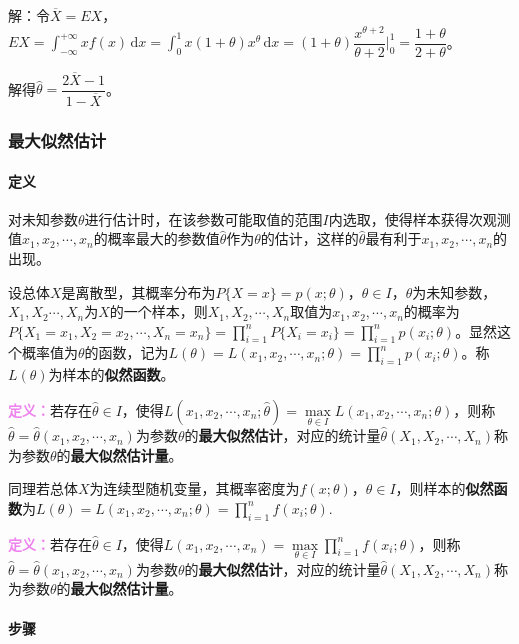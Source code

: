 \documentclass[UTF8, 12pt]{ctexart}
\begin{document}
解：令$\overline{X}=EX$，$EX=\int_{-\infty}^{+\infty}xf(x)\,\textrm{d}x=\int_0^1x(1+\theta)x^\theta\,\textrm{d}x=(1+\theta)\dfrac{x^{\theta+2}}{\theta+2}\bigg|_0^1=\dfrac{1+\theta}{2+\theta}$。

解得$\hat{\theta}=\dfrac{2\overline{X}-1}{1-\overline{X}}$。

\subsubsection{最大似然估计}

\paragraph{定义} \leavevmode \medskip

对未知参数$\theta$进行估计时，在该参数可能取值的范围$I$内选取，使得样本获得次观测值$x_1,x_2,\cdots,x_n$的概率最大的参数值$\hat{\theta}$作为$\theta$的估计，这样的$\hat{\theta}$最有利于$x_1,x_2,\cdots,x_n$的出现。

设总体$X$是离散型，其概率分布为$P\{X=x\}=p(x;\theta)$，$\theta\in I$，$\theta$为未知参数，$X_1,X_2\cdots,X_n$为$X$的一个样本，则$X_1,X_2,\cdots,X_n$取值为$x_1,x_2,\cdots,x_n$的概率为$P\{X_1=x_1,X_2=x_2,\cdots,X_n=x_n\}=\prod\limits_{i=1}^nP\{X_i=x_i\}=\prod\limits_{i=1}^np(x_i;\theta)$。显然这个概率值为$\theta$的函数，记为$L(\theta)=L(x_1,x_2,\cdots,x_n;\theta)=\prod\limits_{i=1}^np(x_i;\theta)$。称$L(\theta)$为样本的\textbf{似然函数}。

\textcolor{violet}{\textbf{定义：}}若存在$\hat{\theta}\in I$，使得$L(x_1,x_2,\cdots,x_n;\hat{\theta})=\max\limits_{\theta\in I}L(x_1,x_2,\cdots,x_n;\theta)$，则称$\hat{\theta}=\hat{\theta}(x_1,x_2,\cdots,x_n)$为参数$\theta$的\textbf{最大似然估计}，对应的统计量$\hat{\theta}(X_1,X_2,\cdots,X_n)$称为参数$\theta$的\textbf{最大似然估计量}。

同理若总体$X$为连续型随机变量，其概率密度为$f(x;\theta)$，$\theta\in I$，则样本的\textbf{似然函数}为$L(\theta)=L(x_1,x_2,\cdots,x_n;\theta)=\prod\limits_{i=1}^nf(x_i;\theta)$.

\textcolor{violet}{\textbf{定义：}}若存在$\hat{\theta}\in I$，使得$L(x_1,x_2,\cdots,x_n)=\max\limits_{\theta\in I}\prod\limits_{i=1}^nf(x_i;\theta)$，则称$\hat{\theta}=\hat{\theta}(x_1,x_2,\cdots,x_n)$为参数$\theta$的\textbf{最大似然估计}，对应的统计量$\hat{\theta}(X_1,X_2,\cdots,X_n)$称为参数$\theta$的\textbf{最大似然估计量}。

\paragraph{步骤} \leavevmode \medskip
\end{document}
